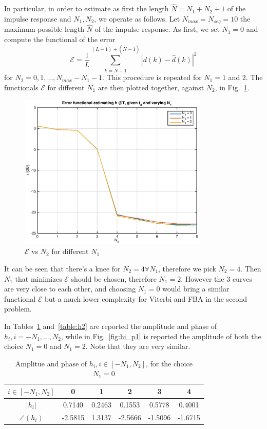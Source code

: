 \documentclass[10pt]{article}
\begin{document}
In particular, in order to estimate as first the length $\hat{N} = N_1 + N_2 + 1$ of the impulse response and $N_1, N_2$, we operate as follows. Let $N_{max} = N_{seq} = 10$ the maximum possible length $\hat{N}$ of the impulse response. As first, we set $N_1 = 0$ and compute the functional of the error 
\begin{equation} 
	\mathcal{E} = \frac{1}{L}\sum_{k = \hat{N} - 1}^{(L-1)+(\hat{N}-1)}|d(k)-\hat{d}(k)|^2
	\label{eq:functional}
\end{equation}
for $N_2 = 0, 1, \dots, N_{max} - N_1 - 1$. This procedure is repeated for $N_1 = 1$ and $2$. The functionals $\mathcal{E}$ for different $N_1$ are then plotted together, against $N_2$, in Fig.~\ref{fig:functional}.
\begin{figure}
	\centering
	\includegraphics[width = 0.8\textwidth]{error_func_p1}
	\caption{$\mathcal{E}$ vs $N_2$ for different $N_1$}
	\label{fig:functional}
\end{figure}
It can be seen that there's a knee for $N_2 = 4 \forall N_1$, therefore we pick $N_2 = 4$. Then $N_1$ that minimizes $\mathcal{E}$ should be chosen, therefore $N_1 = 2$. However the 3 curves are very close to each other, and choosing $N_1 = 0$ would bring a similar functional $\mathcal{E}$ but a much lower complexity for Viterbi and FBA in the second problem. 

In Tables~\ref{table:h0} and~\ref{table:h2} are reported the amplitude and phase of $h_i, i = -N_1, \dots, N_2$, while in Fig.~\ref{fig:hi_p1} is reported the amplitude of both the choice $N_1 = 0$ and $N_1 = 2$. Note that they are very similar.


\begin{table}
	\centering
	\begin{tabular}{c|c|c|c|c|c}
		$i \in [-N_1, N_2]$ & 0 & 1 & 2 & 3 & 4 \\ \hline
		$|h_i|$ 		& 0.7140  &  0.2463  &  0.1553  &  0.5778  &  0.4001 \\
		$\angle(h_i)$ 	& -2.5815  &  1.3137  & -2.5666  & -1.5096  & -1.6715 \\
	\end{tabular}
	\caption{Amplitue and phase of $h_i, i \in [-N_1, N_2]$, for the choice $N_1 = 0$}
	\label{table:h0}
\end{table}
\end{document}
